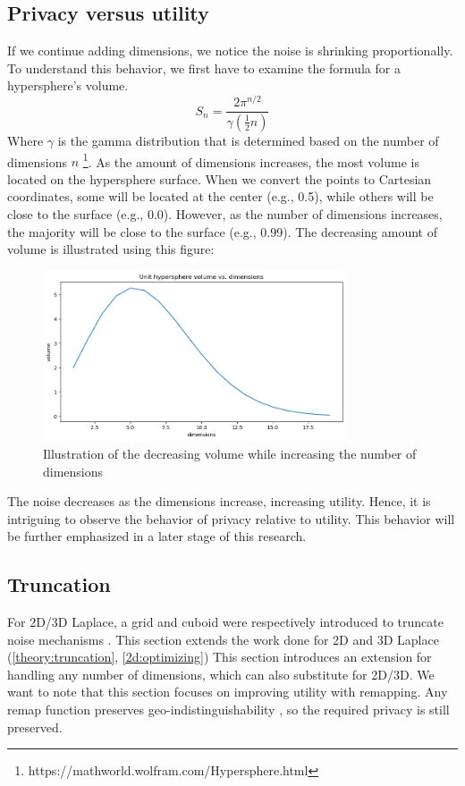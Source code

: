 \subsection{Privacy versus utility} \label{theory:privacy-utility-nd}
If we continue adding dimensions, we notice the noise is shrinking proportionally.
To understand this behavior, we first have to examine the formula for a hypersphere’s volume.
\begin{equation}
  S_n = \frac{2 \pi^{n/2}}{\gamma(\frac{1}{2}n)}
\end{equation}
Where $\gamma$ is the gamma distribution that is determined based on the number of dimensions $n$ \footnote{https://mathworld.wolfram.com/Hypersphere.html}.
As the amount of dimensions increases, the most volume is located on the hypersphere surface.
When we convert the points to Cartesian coordinates, some will be located at the center (e.g., 0.5), while others will be close to the surface (e.g., 0.0).
However, as the number of dimensions increases, the majority will be close to the surface (e.g., 0.99).
The decreasing amount of volume is illustrated using this figure:
\begin{figure}[H]
  \includegraphics[width=0.8\textwidth]{TheorethicalFramework/ND-Laplace/Images/volume.png}
  \caption{Illustration of the decreasing volume while increasing the number of dimensions}
  \label{fig:curse-of-dimensionality}
\end{figure}

The noise decreases as the dimensions increase, increasing utility.
Hence, it is intriguing to observe the behavior of privacy relative to utility.
This behavior will be further emphasized in a later stage of this research.
\newpage
\subsection{Truncation}
For 2D/3D Laplace, a grid and cuboid were respectively introduced to truncate noise mechanisms \citep{DBLP:journals/corr/abs-1212-1984,9646489}.
This section extends the work done for 2D and 3D Laplace (\ref{theory:truncation}, \ref{2d:optimizing}) \newline
This section introduces an extension for handling any number of dimensions, which can also substitute for 2D/3D.
We want to note that this section focuses on improving utility with remapping.
Any remap function preserves geo-indistinguishability \cite{chatzikokolakis_efficient_2017}, so the required privacy is still preserved.

